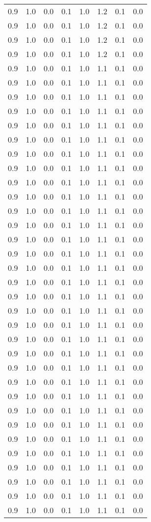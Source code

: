\begin{tabular}{L{1in}|L{1in}|L{1in}|L{1in}|L{1in}|L{1in}|L{1in}|L{1in}}
0.9&1.0&0.0&0.1&1.0&1.2&0.1&0.0\\
0.9&1.0&0.0&0.1&1.0&1.2&0.1&0.0\\
0.9&1.0&0.0&0.1&1.0&1.2&0.1&0.0\\
0.9&1.0&0.0&0.1&1.0&1.2&0.1&0.0\\
0.9&1.0&0.0&0.1&1.0&1.1&0.1&0.0\\
0.9&1.0&0.0&0.1&1.0&1.1&0.1&0.0\\
0.9&1.0&0.0&0.1&1.0&1.1&0.1&0.0\\
0.9&1.0&0.0&0.1&1.0&1.1&0.1&0.0\\
0.9&1.0&0.0&0.1&1.0&1.1&0.1&0.0\\
0.9&1.0&0.0&0.1&1.0&1.1&0.1&0.0\\
0.9&1.0&0.0&0.1&1.0&1.1&0.1&0.0\\
0.9&1.0&0.0&0.1&1.0&1.1&0.1&0.0\\
0.9&1.0&0.0&0.1&1.0&1.1&0.1&0.0\\
0.9&1.0&0.0&0.1&1.0&1.1&0.1&0.0\\
0.9&1.0&0.0&0.1&1.0&1.1&0.1&0.0\\
0.9&1.0&0.0&0.1&1.0&1.1&0.1&0.0\\
0.9&1.0&0.0&0.1&1.0&1.1&0.1&0.0\\
0.9&1.0&0.0&0.1&1.0&1.1&0.1&0.0\\
0.9&1.0&0.0&0.1&1.0&1.1&0.1&0.0\\
0.9&1.0&0.0&0.1&1.0&1.1&0.1&0.0\\
0.9&1.0&0.0&0.1&1.0&1.1&0.1&0.0\\
0.9&1.0&0.0&0.1&1.0&1.1&0.1&0.0\\
0.9&1.0&0.0&0.1&1.0&1.1&0.1&0.0\\
0.9&1.0&0.0&0.1&1.0&1.1&0.1&0.0\\
0.9&1.0&0.0&0.1&1.0&1.1&0.1&0.0\\
0.9&1.0&0.0&0.1&1.0&1.1&0.1&0.0\\
0.9&1.0&0.0&0.1&1.0&1.1&0.1&0.0\\
0.9&1.0&0.0&0.1&1.0&1.1&0.1&0.0\\
0.9&1.0&0.0&0.1&1.0&1.1&0.1&0.0\\
0.9&1.0&0.0&0.1&1.0&1.1&0.1&0.0\\
0.9&1.0&0.0&0.1&1.0&1.1&0.1&0.0\\
0.9&1.0&0.0&0.1&1.0&1.1&0.1&0.0\\
0.9&1.0&0.0&0.1&1.0&1.1&0.1&0.0\\
0.9&1.0&0.0&0.1&1.0&1.1&0.1&0.0\\
0.9&1.0&0.0&0.1&1.0&1.1&0.1&0.0\\
0.9&1.0&0.0&0.1&1.0&1.1&0.1&0.0\\

\end{tabular}
